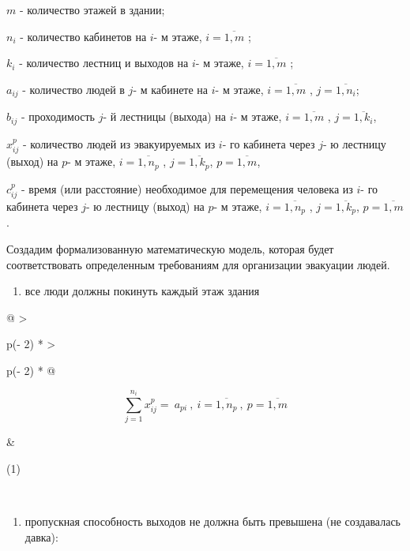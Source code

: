 \documentclass[
]{article}
\begin{document}
\(m\) - количество этажей в здании;

\(n_{i}\) - количество кабинетов на \(i\)- м этаже,
\(i = \overline{1,m}\) ;

\(k_{i}\) - количество лестниц и выходов на \(i\)- м этаже,
\(i = \overline{1,m}\) ;

\(a_{ij}\) - количество людей в \(j\)- м кабинете на \(i\)- м этаже,
\(i = \overline{1,m}\) , \(j = \overline{1,n_{i}}\);

\(b_{ij}\) - проходимость \(j\)- й лестницы (выхода) на \(i\)- м этаже,
\(i = \overline{1,m}\) , \(j = \overline{1,k_{i}}\),

\(x_{ij}^{p}\) - количество людей из эвакуируемых из \(i\)- го кабинета
через \(j\)- ю лестницу (выход) на \(p\)- м этаже,
\(i = \overline{1,n_{p}}\) , \(j = \overline{1,k_{p}}\),
\(p = \overline{1,m}\),

\(c_{ij}^{p}\) - время (или расстояние) необходимое для перемещения
человека из \(i\)- го кабинета через \(j\)- ю лестницу (выход) на \(p\)-
м этаже, \(i = \overline{1,n_{p}}\) , \(j = \overline{1,k_{p}}\),
\(p = \overline{1,m}\).

Создадим формализованную математическую модель, которая будет
соответствовать определенным требованиям для организации эвакуации
людей.

\begin{enumerate}
\def\labelenumi{\arabic{enumi})}
\item
  все люди должны покинуть каждый этаж здания
\end{enumerate}

\begin{longtable}[]{@{}
  >{\raggedright\arraybackslash}p{(\columnwidth - 2\tabcolsep) * }
  >{\raggedright\arraybackslash}p{(\columnwidth - 2\tabcolsep) * }@{}}
\toprule\noalign{}
\begin{minipage}[b]{\linewidth}\raggedright
\[\sum_{j = 1}^{n_{i}}x_{ij}^{p} = \ a_{pi}\ ,\ i = \overline{1,n_{p}}\ ,\ p = \overline{1,m}\]
\end{minipage} & \begin{minipage}[b]{\linewidth}\raggedright
(1)
\end{minipage} \\
\midrule\noalign{}
\endhead
\bottomrule\noalign{}
\endlastfoot
\end{longtable}

\begin{enumerate}
\def\labelenumi{\arabic{enumi})}
\setcounter{enumi}{1}
\item
  пропускная способность выходов не должна быть превышена (не
  создавалась давка):
\end{enumerate}
\end{document}

